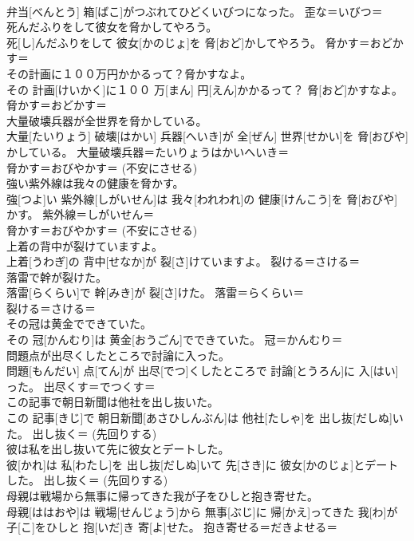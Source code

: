 \documentclass[8pt]{extreport}
\begin{document}
\begin{CJK}{UTF8}{min}
\\	弁当[べんとう] 箱[ばこ]がつぶれてひどくいびつになった。	歪な＝いびつ＝ 
\\	死んだふりをして彼女を脅かしてやろう。	
\\	死[し]んだふりをして 彼女[かのじょ]を 脅[おど]かしてやろう。	脅かす＝おどかす＝ 
\\	その計画に１００万円かかるって？脅かすなよ。	
\\	その 計画[けいかく]に１００ 万[まん] 円[えん]かかるって？ 脅[おど]かすなよ。	脅かす＝おどかす＝ 
\\	大量破壊兵器が全世界を脅かしている。	
\\	大量[たいりょう] 破壊[はかい] 兵器[へいき]が 全[ぜん] 世界[せかい]を 脅[おびや]かしている。	大量破壊兵器＝たいりょうはかいへいき＝ 
\\	脅かす＝おびやかす＝ (不安にさせる) 
\\	強い紫外線は我々の健康を脅かす。	
\\	強[つよ]い 紫外線[しがいせん]は 我々[われわれ]の 健康[けんこう]を 脅[おびや]かす。	紫外線＝しがいせん＝ 
\\	脅かす＝おびやかす＝ (不安にさせる) 
\\	上着の背中が裂けていますよ。	
\\	上着[うわぎ]の 背中[せなか]が 裂[さ]けていますよ。	裂ける＝さける＝ 
\\	落雷で幹が裂けた。	
\\	落雷[らくらい]で 幹[みき]が 裂[さ]けた。	落雷＝らくらい＝ 
\\	裂ける＝さける＝ 
\\	その冠は黄金でできていた。	
\\	その 冠[かんむり]は 黄金[おうごん]でできていた。	冠＝かんむり＝ 
\\	問題点が出尽くしたところで討論に入った。	
\\	問題[もんだい] 点[てん]が 出尽[でつ]くしたところで 討論[とうろん]に 入[はい]った。	出尽くす＝でつくす＝ 
\\	この記事で朝日新聞は他社を出し抜いた。	
\\	この 記事[きじ]で 朝日新聞[あさひしんぶん]は 他社[たしゃ]を 出し抜[だしぬ]いた。	出し抜く＝ (先回りする) 
\\	彼は私を出し抜いて先に彼女とデートした。	
\\	彼[かれ]は 私[わたし]を 出し抜[だしぬ]いて 先[さき]に 彼女[かのじょ]とデートした。	出し抜く＝ (先回りする) 
\\	母親は戦場から無事に帰ってきた我が子をひしと抱き寄せた。	
\\	母親[ははおや]は 戦場[せんじょう]から 無事[ぶじ]に 帰[かえ]ってきた 我[わ]が 子[こ]をひしと 抱[いだ]き 寄[よ]せた。	抱き寄せる＝だきよせる＝ 

\end{CJK}
\end{document}
